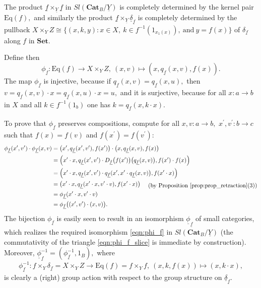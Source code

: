 \documentclass[11pt]{amsart}
\theoremstyle{plain}
\theoremstyle{definition}
\theoremstyle{remark}
\newcommand{\un}{\underline}
\begin{document}
The product $\un{f}\times_{\un{Y}} \un{f}$ in $Sl(\mathbf{Cat}_B/\un{Y})$ is completely determined by the kernel pair $\mathrm{Eq}(f),$ and similarly the product $\un{f}\times_{\un{Y}} \un{\delta}_{\un{f}}$ is completely determined by the pullback $X\times_YZ\cong\{(x,k,y):x\in X, \  k\in f^{-1}(1_{x_1(x)}), \ \text{and} \ y=f(x)\}$ of $\delta_{\un{f}}$ along $f$ in $\mathbf{Set}.$

Define then
\begin{equation}
\label{eqn:simply_trans_action}
\phi_{\un{f}}:\mathrm{Eq}(f) \longrightarrow X\times_Y Z, \ (x,v)\mapsto (x,q_{\un{f}}(x,v),f(x)).
\end{equation}
The map $\phi_{\un{f}}$ is injective, because if $q_{\un{f}}(x,v)=q_{\un{f}}(x,u),$ then $v=q_{\un{f}}(x,v)\cdot x=q_{\un{f}}(x,u)\cdot x=u,$ and it is surjective, because for all $x\colon a\rightarrow b$ in $X$ and all $k\in f^{-1}(1_b)$ one has $k=q_{\un{f}}(x,k\cdot x).$

To prove that $\phi_{\un{f}}$ preserves compositions, compute for all $x,v\colon a\rightarrow b,$ $x^\prime,v^\prime\colon b\rightarrow c$ such that $f(x)=f(v)$ and $f(x^\prime)=f(v^\prime)$:
\begin{equation*}
\begin{split}
\phi_{\un{f}}(x^\prime,v^\prime)\cdot \phi_{\un{f}}(x,v)&=\big(x^\prime,q_{\un{f}}(x^\prime,v^\prime),f(x^\prime)\big)\cdot\big(x,q_{\un{f}}(x,v),f(x)\big) \\
&=\Big(x^\prime\cdot x, q_{\un{f}}(x^\prime,v^\prime)\cdot D_{\un{f}}\big(f(x^\prime)\big)\big(q_{\un{f}}(x,v)\big),f(x^\prime)\cdot f(x) \Big) \\
&=\Big(x^\prime\cdot x, q_{\un{f}}(x^\prime,v^\prime)\cdot q_{\un{f}}(x^\prime,x^\prime\cdot q_{\un{f}}(x,v)\big),f(x^\prime\cdot x)\Big)\\
&=\big(x^\prime\cdot x, q_{\un{f}}(x^\prime\cdot x,v^\prime\cdot v), f(x^\prime\cdot x) \big) \ \ \ \ \txt{(by Proposition \ref{prop:prop_retraction}(3))}\\
&=\phi_{\un{f}}(x^\prime\cdot x,v^\prime\cdot v)\\
&=\phi_{\un{f}}\big((x^\prime,v^\prime)\cdot (x,v)\big).
\end{split}
\end{equation*}
The bijection $\phi_{\un{f}}$ is easily seen to result in an isomorphism $\un{\phi}_{\un{f}}$ of small categories, which realizes the required isomorphism \eqref{eqn:phi_f} in $Sl(\mathbf{Cat}_B/\un{Y})$ (the commutativity of the triangle \eqref{eqn:phi_f_slice} is immediate by construction). Moreover, $\un{\phi}_{\un{f}}^{-1}=(\phi_{\un{f}}^{-1},1_B),$ where
\[
\phi_{\un{f}}^{-1}\colon f\times_Y \delta_{\un{f}}=X\times_Y Z\rightarrow \mathrm{Eq}(f)=f\times_Y f, \ (x,k,f(x))\mapsto (x,k\cdot x),
\]
is clearly a (right) group action with respect to the group structure on $\un{\delta}_{\un{f}}.$
\end{document}
